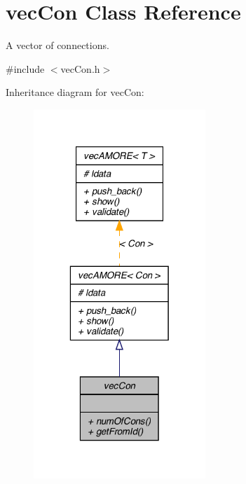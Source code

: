 \hypertarget{classvec_con}{
\section{vecCon Class Reference}
\label{classvec_con}
}


A vector of connections.  




{\ttfamily \#include $<$vecCon.h$>$}



Inheritance diagram for vecCon:
\nopagebreak
\begin{figure}[H]
\begin{center}
\leavevmode
\includegraphics[width=184pt]{classvec_con__inherit__graph}
\end{center}
\end{figure}


